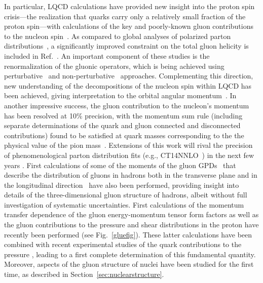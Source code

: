 In particular, LQCD calculations have provided new insight into the proton spin crisis---the realization that quarks carry only a relatively small fraction of the proton spin---with calculations of the key and poorly-known gluon contributions to the nucleon spin~\cite{Alexandrou:2017oeh,Yang:2016plb}.  As compared to global analyses of polarized parton distributions~\cite{deFlorian:2014yva}, a significantly improved constraint on the total gluon helicity is included in Ref.~\cite{Yang:2016plb}. An important component of these studies is the renormalization of the gluonic operators, which is being achieved using  perturbative~\cite{Glatzmaier:2014sya,Alexandrou:2017oeh} and non-perturbative~\cite{Yang:2018bft} approaches. Complementing this direction, new understanding of the decompositions of the nucleon spin within LQCD has been achieved, giving interpretation to the   orbital angular momentum~\cite{Engelhardt:2017miy}. 
%
In another impressive success, the gluon contribution to the nucleon's momentum has been resolved at 10\% precision, with the momentum sum rule (including separate determinations of the quark and gluon connected and disconnected contributions) found to be satisfied at quark masses corresponding to the the physical value of the pion mass~\cite{Alexandrou:2017oeh}. Extensions of this work will rival the precision of phenomenological parton distribution fits (e.g., CT14NNLO~\cite{Dulat:2015mca}) in the next few years \cite{Lin:2017snn}.
%
First calculations of some of the moments of the gluon GPDs~\cite{Diehl:2003ny} that describe the distribution of gluons in hadrons both in the transverse plane and in the longitudinal direction~\cite{Detmold:2016gpy,Detmold:2017oqb} have also been performed, providing  insight into details of the three-dimensional gluon structure of hadrons, albeit without full investigation of systematic uncertainties. 
First calculations of the momentum transfer dependence of the gluon energy-momentum tensor form factors as well as the gluon contributions to the pressure and shear distributions in the proton have recently been performed \cite{Shanahan:2018nnv,Shanahan:2018pib} (see Fig.~\ref{gluefig}). These latter calculations have been combined with recent experimental studies of the quark contributions to the pressure \cite{Burkert:2018bqq}, leading to a first complete determination of this fundamental quantity.
Moreover, aspects of the gluon structure of nuclei have been studied for the first time,  as described in Section~\ref{sec:nuclearstructure}.

